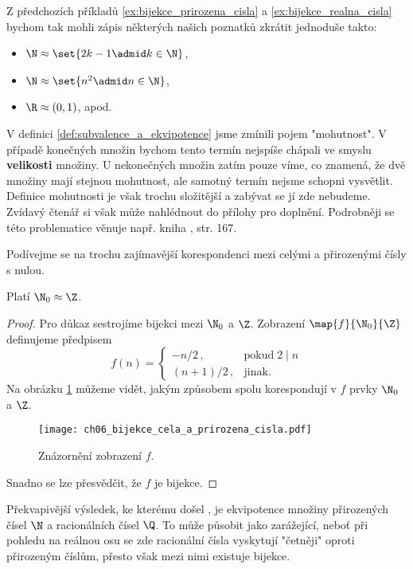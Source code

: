 Z předchozích příkladů \ref{ex:bijekce_prirozena_cisla} a \ref{ex:bijekce_realna_cisla} bychom tak mohli zápis některých našich poznatků zkrátit jednoduše takto:
\begin{itemize}
    \item $\N\approx\set{2k-1\admid k\in\N}$,
    \item $\N\approx\set{n^2\admid n\in\N}$,
    \item $\R\approx(0,1)$, apod.
\end{itemize}
V definici \ref{def:subvalence_a_ekvipotence} jsme zmínili pojem "mohutnost". V případě konečných množin bychom tento termín nejspíše chápali ve smyslu \textbf{velikosti} množiny. U nekonečných množin zatím pouze víme, co znamená, že dvě množiny mají stejnou mohutnost, ale samotný termín nejsme schopni vysvětlit. Definice mohutnosti je však trochu složitější a zabývat se jí zde nebudeme. Zvídavý čtenář si však může nahlédnout do přílohy  pro doplnění. Podrobněji se této problematice věnuje např. kniha \cite{Potter2009}, str. 167.\par
Podívejme se na trochu zajímavější korespondenci mezi celými a přirozenými čísly s nulou.
\begin{theorem}\label{thm:N_a_Z}
    Platí $\N_0\approx\Z$.
\end{theorem}
\begin{proof}
    Pro důkaz sestrojíme bijekci mezi $\N_0$ a $\Z$. Zobrazení $\map{f}{\N_0}{\Z}$ definujeme předpisem
    \begin{equation*}
        f(n)=\left\{
        \begin{array}{ll}
            -n/2\,, & \text{pokud}\;2\mid n\\
            (n+1)/2\,, & \text{jinak}.
        \end{array}
        \right.
    \end{equation*}
    Na obrázku \ref{fig:bijekce_cela_a_prirozena_cisla} můžeme vidět, jakým způsobem spolu korespondují v $f$ prvky $\N_0$ a $\Z$.
    \begin{figure}[H]
        \centering
        \texttt{[image: ch06\_bijekce\_cela\_a\_prirozena\_cisla.pdf]}
        \caption{Znázornění zobrazení $f$.}
        \label{fig:bijekce_cela_a_prirozena_cisla}
    \end{figure}
    Snadno se lze přesvědčit, že $f$ je bijekce.
\end{proof}
Překvapivější výsledek, ke kterému došel , je ekvipotence množiny přirozených čísel $\N$ a racionálních čísel $\Q$. To může působit jako zarážející, neboť při pohledu na reálnou osu se zde racionální čísla vyskytují "četněji" oproti přirozeným číslům, přesto však mezi nimi existuje bijekce.
